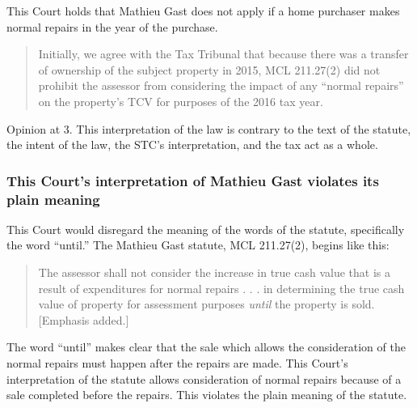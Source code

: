 \documentclass[12pt,\documentclassflag]{michiganCourtOfAppealsBrief}
\begin{document}
This Court holds that Mathieu Gast does not apply if a home purchaser makes normal repairs in the year of the purchase.

\begin{quote}
Initially, we agree with the Tax Tribunal that because there was a transfer of ownership of the
subject property in 2015, MCL 211.27(2) did not prohibit the assessor from considering the impact
of any ``normal repairs'' on the property's TCV for purposes of the 2016 tax year.
\end{quote}
Opinion at 3. This interpretation of the law is contrary to the text of the statute, the intent of the law, the STC's interpretation, and the tax act as a whole.

\subsubsection{This Court's interpretation of Mathieu Gast violates its plain meaning}

This Court would disregard the meaning of the words of the statute, specifically the word ``until.'' 
The Mathieu Gast statute, MCL 211.27(2), begins like this:

\begin{quote}
  The assessor shall not consider the increase in true cash value that is a result of expenditures for normal repairs . . . in determining the true cash value of property for assessment purposes \emph{until} the property is sold. [Emphasis added.]
\end{quote}

The word ``until'' makes clear that the sale which allows the consideration of the normal repairs must happen after the repairs are made. This Court's interpretation of the statute allows consideration of normal repairs because of a sale completed before the repairs. This violates the plain meaning of the statute.






\end{document}
